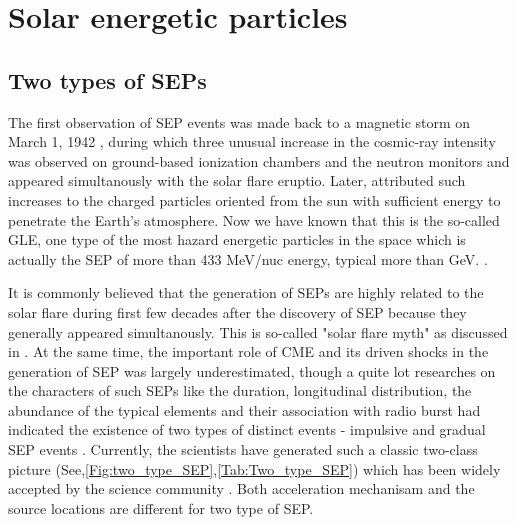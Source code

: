 \section{Solar energetic particles}

\subsection{Two types of SEPs}


The first observation of \ac{SEP} events was made back to a magnetic storm on March 1, 1942 \citep{lange1942note,forbush1942further}, during which three unusual increase in the cosmic-ray intensity was observed on ground-based ionization chambers and the neutron monitors and appeared simultanously with the solar flare eruptio. Later, \citep{Forbush1946} attributed such increases to the charged particles oriented from the sun with sufficient energy to penetrate the Earth's atmosphere. Now we have known that this is the so-called \ac{GLE}, one type of the most hazard energetic particles in the space which is actually the \ac{SEP} of more than 433 MeV/nuc energy, typical more than GeV. \citep{meyer1956solar,Shea2012SSRv,gopalswamy2013first,thakur2014ground, Reames2013}.

It is commonly believed that the generation of \acp{SEP} are highly related to the solar flare during first few decades after the discovery of \ac{SEP} because they generally appeared simultanously. This is so-called "solar flare myth" as discussed in \citep{gosling1993the}. At the same time, the important role of CME and its driven shocks in the generation of \ac{SEP} was largely underestimated, though a quite lot researches on the characters of such \acp{SEP} like the duration, longitudinal distribution, the abundance of the typical elements and their association with radio burst had indicated the existence of two types of distinct events - impulsive and gradual \ac{SEP} events \citep{kahler1978prompt,kahler1984associations,cliver1982injection,cane1986two, reames1988ApJ}.
Currently, the scientists have generated such a classic two-class picture (See,\ref{Fig:two_type_SEP},\ref{Tab:Two_type_SEP}) which has been widely accepted by the science community \citep{kallenrode2003current, reames2013two,Desai_Diacalone2016LRSP, Reames2021LNP}. Both acceleration mechanisam and the source locations are different for two type of \ac{SEP}.


